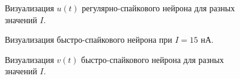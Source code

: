 \begin{figure}[h]
	\caption{Визуализация $u(t)$ регулярно-спайкового нейрона для разных значений $I$.}
	\label{rs_different_I_recovery}
\end{figure}

\begin{figure}[h]
\caption{Визуализация быстро-спайкового нейрона при $I=15$ нА.}
\label{1_fs}
\end{figure}

\begin{figure}[h]
	\caption{Визуализация $v(t)$ быстро-спайкового нейрона для разных значений $I$.}
	\label{fs_different_I_potentials}
\end{figure}

